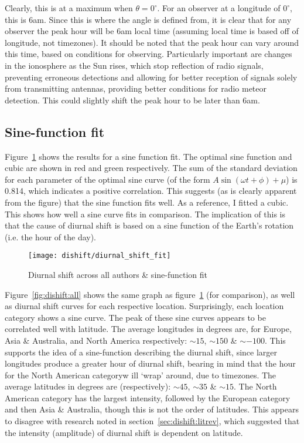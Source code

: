 Clearly, this is at a maximum when $\theta = 0^{\circ}$. For an observer at a longitude of $0^{\circ}$, this is 6am. Since this is where the angle is defined from, it is clear that for any observer the peak hour will be 6am local time (assuming local time is based off of longitude, not timezones). It should be noted that the peak hour can vary around this time, based on conditions for observing. Particularly important are changes in the ionosphere as the Sun rises, which stop reflection of radio signals, preventing erroneous detections and allowing for better reception of signals solely from transmitting antennas, providing better conditions for radio meteor detection. This could slightly shift the peak hour to be later than 6am.

\subsection{Sine-function fit}
Figure~\ref{fig:dishift:fit} shows the results for a sine function fit. The optimal sine function and cubic are shown in red and green respectively.  The sum of the standard deviation for each parameter of the optimal sine curve (of the form $A \sin \left( \omega t + \phi \right) + \mu$) is 0.814, which indicates a positive correlation. This suggests (as is clearly apparent from the figure) that the sine function fits well. As a reference, I fitted a cubic. This shows how well a sine curve fits in comparison. The implication of this is that the cause of diurnal shift is based on a sine function of the Earth's rotation (i.e. the hour of the day).

\begin{figure}[h!]
	\centering
	\texttt{[image: dishift/diurnal\_shift\_fit]}
	\caption{Diurnal shift across all authors \& sine-function fit
		\label{fig:dishift:fit}}
\end{figure}

Figure~\ref{fig:dishift:all} shows the same graph as figure~\ref{fig:dishift:fit} (for comparison), as well as diurnal shift curves for each respective location. Surprisingly, each location category shows a sine curve. The peak of these sine curves appears to be correlated well with latitude. The average longitudes in degrees are, for Europe, Asia \& Australia, and North America respectively: $\sim 15$, $\sim 150$ \& $\sim -100$. This supports the idea of a sine-function describing the diurnal shift, since larger longitudes produce a greater hour of diurnal shift, bearing in mind that the hour for the North American categoryw ill `wrap' around, due to timezones. The average latitudes in degrees are (respectively): $\sim 45$, $\sim 35$ \& $\sim 15$. The North American category has the largest intensity, followed by the European category and then Asia \& Australia, though this is not the order of latitudes. This appears to disagree with research noted in section~\ref{sec:dishift:litrev}, which suggested that the intensity (amplitude) of diurnal shift is dependent on latitude.  

